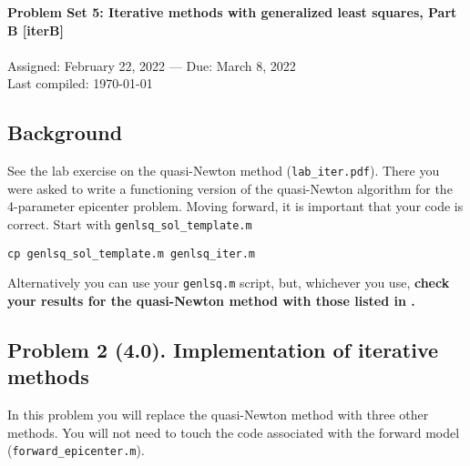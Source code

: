 \documentclass[11pt,titlepage,fleqn]{article}
\begin{document}
 

\begin{spacing}{1.2}
\centering
{\large \bf Problem Set 5: Iterative methods with generalized least squares, Part B [iterB]} \\
\cltag\ \\
Assigned: February 22, 2022 --- Due: March 8, 2022 \\
Last compiled: \today
\end{spacing}


\subsection*{Background}

See the lab exercise on the quasi-Newton method (\verb+lab_iter.pdf+). There you were asked to write a functioning version of the quasi-Newton algorithm for the 4-parameter epicenter problem. Moving forward, it is important that your code is correct. Start with \verb+genlsq_sol_template.m+
%
\begin{verbatim}
cp genlsq_sol_template.m genlsq_iter.m
\end{verbatim}
%
Alternatively you can use your \verb+genlsq.m+ script, but, whichever you use, {\bf check your results for the quasi-Newton method with those listed in .}

\subsection*{Problem 2 (4.0). Implementation of iterative methods}

In this problem you will replace the quasi-Newton method with three other methods. You will not need to touch the code associated with the forward model (\verb+forward_epicenter.m+).
\end{document}
